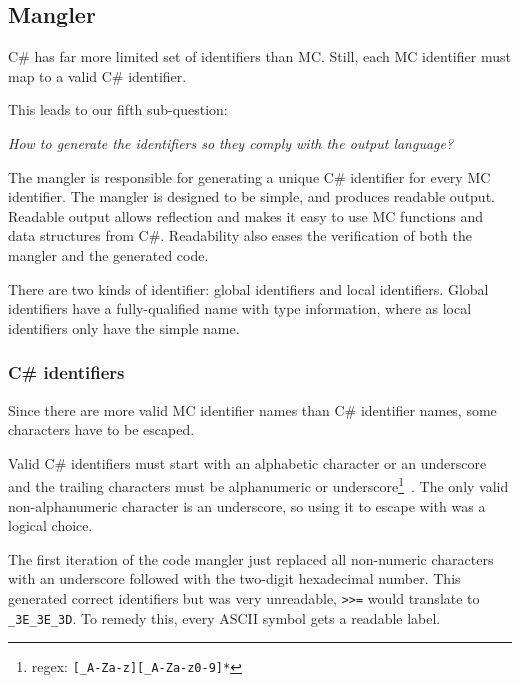 \subsection{Mangler}
C\# has far more limited set of identifiers than MC.
Still, each MC identifier must map to a valid C\# identifier.

This leads to our fifth sub-question:

\textit{How to generate the identifiers so they comply with the output language?}

The mangler is responsible for generating a unique C\# identifier for every MC identifier.
The mangler is designed to be simple, and produces readable output.
Readable output allows reflection and makes it easy to use MC functions and data structures from C\#.
Readability also eases the verification of both the mangler and the generated code.

There are two kinds of identifier: global identifiers and local identifiers.
Global identifiers have a fully-qualified name with type information, where as local identifiers only have the simple name.

\subsubsection{C\# identifiers}
Since there are more valid MC identifier names than C\# identifier names, some characters have to be escaped.

Valid C\# identifiers must start with an alphabetic character or an underscore and the trailing characters must be alphanumeric or underscore\footnote{regex: \texttt{[\_A-Za-z][\_A-Za-z0-9]*}}~\cite{msdn_identifiers}.
The only valid non-alphanumeric character is an underscore, so using it to escape with was a logical choice.

The first iteration of the code mangler just replaced all non-numeric characters with an underscore followed with the two-digit hexadecimal number.
This generated correct identifiers but was very unreadable, \verb|>>=| would translate to \verb|_3E_3E_3D|.
To remedy this, every ASCII symbol gets a readable label.

